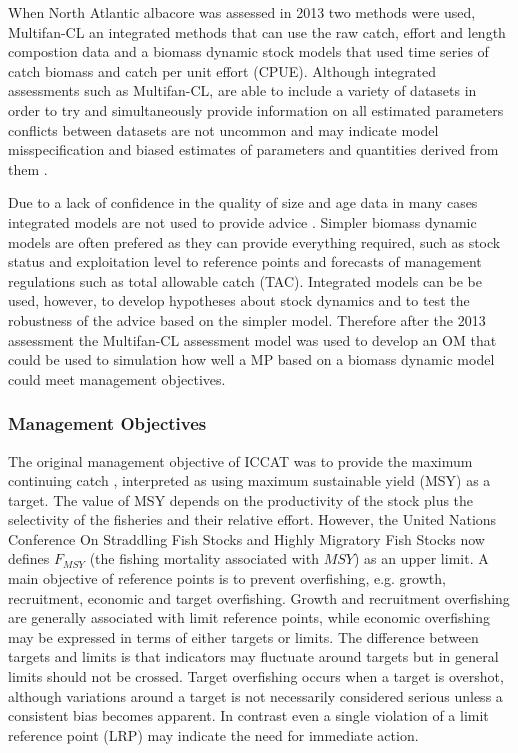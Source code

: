 \documentclass[%
nonumbib,      %
%
]{nrc1}                          %
\begin{document}
When North Atlantic albacore was assessed in 2013 two methods were used, Multifan-CL an integrated methods \citep{fournier1998mfcl} that can use the raw catch, effort and length compostion data  and a biomass dynamic stock models \cite[e.g.][]{prager1994suite} that used time series of catch biomass and catch per unit effort (CPUE). Although integrated assessments such as Multifan-CL, are able to include a variety of datasets in order to try and simultaneously provide information on all estimated parameters conflicts between datasets are not uncommon and may indicate model misspecification and biased estimates of parameters and quantities derived from them \citep{maunder2017dealing}. 

Due to a lack of confidence in the quality of size and age data in many cases integrated models are not used to provide advice \citep{fromentin2014spectre}. Simpler biomass dynamic models are often prefered as they can provide everything required, such as stock status and exploitation level to reference points and forecasts of management regulations such as total allowable catch (TAC).  Integrated models can be be used, however, to develop hypotheses about stock dynamics and to test the robustness of the advice based on the simpler model. Therefore after the 2013 assessment the Multifan-CL assessment model was used to develop an OM that could be used to simulation how well a MP based on a biomass dynamic model could meet management objectives. 

\subsubsection*{Management Objectives} 

The original management objective of ICCAT was to provide the maximum continuing catch \citep{iccat2007basictext}, interpreted as using maximum sustainable yield (MSY) as a target. The value of MSY depends on the productivity of the stock plus the selectivity of the fisheries and their relative effort. However, the United Nations Conference On Straddling Fish Stocks and Highly Migratory Fish Stocks \cite[UNFSA][]{un1995straddling} now defines $F_{MSY}$ (the fishing mortality  associated  with $MSY$) as an upper limit. A main objective of reference points is to prevent overfishing, e.g. growth, recruitment, economic and target overfishing. Growth and recruitment overfishing are generally associated with limit reference points, while economic overfishing may be expressed in terms of either targets or limits. The difference between targets and limits is that indicators may fluctuate around targets but in general limits should not be crossed. Target overfishing occurs when a target is overshot, although variations around a target is not necessarily considered serious unless a consistent bias becomes apparent. In contrast even a single violation of a limit reference point (LRP) may indicate the need for immediate action. 
\end{document}
